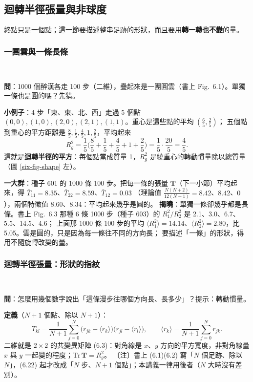 \subsection{迴轉半徑張量與非球度}
\leavevmode{}\quad 終點只是一個點；這一節要描述整串足跡的形狀，而且要用\textbf{轉一轉也不變}的量。

\subsubsection{一團雲與一條長條}
\leavevmode{}\ \par\nopagebreak

\textbf{問}：1000 個醉漢各走 100 步（二維），疊起來是一團圓雲（書上 Fig.~6.1）。單獨一條也是圓的嗎？先猜。

\textbf{小例子}：4 步「東、東、北、西」走過 5 個點 $(0,0),(1,0),(2,0),(2,1),(1,1)$。重心是這些點的平均 $(\frac65,\frac25)$；
五個點到重心的平方距離是 $\frac85,\frac15,\frac45,1,\frac25$，平均起來
\[R_g^2=\frac15\Big(\frac85+\frac15+\frac45+1+\frac25\Big)=\frac15\cdot\frac{20}{5}=\frac45 .\]
這就是\textbf{迴轉半徑的平方}：每個點當成質量 1，$R_g^2$ 是繞重心的轉動慣量除以總質量（圖 \ref{six-fig-shape} 左）。

\textbf{一大群}：種子 601 的 1000 條 100 步。把每一條的張量 $\mathbf T$（下一小節）平均起來，得 $\bar T_{11}=8.35$、$\bar T_{22}=8.59$、$\bar T_{12}=0.03$
（理論值 $\frac{N(N+2)}{12(N+1)}=8.42$、$8.42$、$0$），兩個特徵值 8.60、8.34：平均起來幾乎是圓的。
\textbf{揭曉}：單獨一條卻幾乎都是長條。書上 Fig.~6.3 那種 6 條 1000 步（種子 603）的 $R_1^2/R_2^2$ 是 2.1、3.0、6.7、5.5、14.5、4.6；
上面那 1000 條 100 步的平均 $\langle R_1^2\rangle=14.14$、$\langle R_2^2\rangle=2.80$，比 5.05。雲是圓的，只是因為每一條往不同的方向長；
要描述「一條」的形狀，得用不隨旋轉改變的量。

\subsubsection{迴轉半徑張量：形狀的指紋}
\leavevmode{}\ \par\nopagebreak

\textbf{問}：怎麼用幾個數字說出「這條漫步往哪個方向長、長多少」？提示：轉動慣量。

\textbf{定義}（$N+1$ 個點、除以 $N+1$）：
\[T_{kl}=\frac{1}{N+1}\sum_{j=0}^{N}\big(r_{jk}-\langle r_k\rangle\big)\big(r_{jl}-\langle r_l\rangle\big),\qquad
\langle r_k\rangle=\frac{1}{N+1}\sum_{j=0}^{N}r_{jk}.\tag{6.1, 6.2}\]
二維就是 $2\times2$ 的共變異矩陣 (6.3)：對角線是 $x$、$y$ 方向的平方寬度，非對角線量 $x$ 與 $y$ 一起變的程度；$\mathrm{Tr}\,\mathbf T=R_g^2$。
〔注〕書上 (6.1)(6.2) 寫「$N$ 個足跡、除以 $N$」，(6.22) 起才改成「$N$ 步、$N+1$ 個點」；本講義一律用後者（$N$ 大時沒有差別）。

